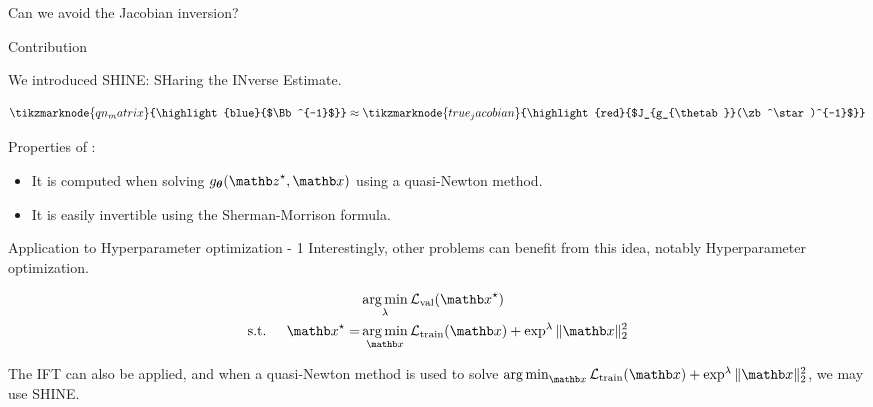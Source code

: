 \begin{frame}{Can we avoid the Jacobian inversion?}
    \begin{exampleblock}{Contribution}
    \end{exampleblock}
    
    We introduced SHINE: SHaring the INverse Estimate.

    \begin{equation*}
        \tikzmarknode{qn_matrix}{\highlight{blue}{$\Bb^{-1}$}} \approx \tikzmarknode{true_jacobian}{\highlight{red}{$J_{g_{\thetab}}(\zb^\star)^{-1}$}}
    \end{equation*}

    \pause

    \hfill \break
    Properties of :
    \begin{itemize}
        \item<4-> It is computed when solving $g_\thetab(\zb^\star, \xb)$ using a quasi-Newton method.
        \item<5-> It is easily invertible using the Sherman-Morrison formula.
    \end{itemize}
\end{frame}

\begin{frame}{Application to Hyperparameter optimization - 1}
    Interestingly, other problems can benefit from this idea, notably Hyperparameter optimization.

    \begin{equation*}
        \begin{split}
            &\argmin_{\lambda} \mathcal{L}_{\text{val}}(\xb^\star)\\
            \text{s.t. } \quad \xb^\star = &\argmin_{\xb} \mathcal{L}_{\text{train}}(\xb) + \exp^{\lambda} \|\xb\|_2^2
        \end{split}
    \end{equation*}

    \pause
    The IFT can also be applied, and when a quasi-Newton method is used to solve $\argmin_{\xb} \mathcal{L}_{\text{train}}(\xb) + \exp^{\lambda} \|\xb\|_2^2$, we may use SHINE.
\end{frame}

